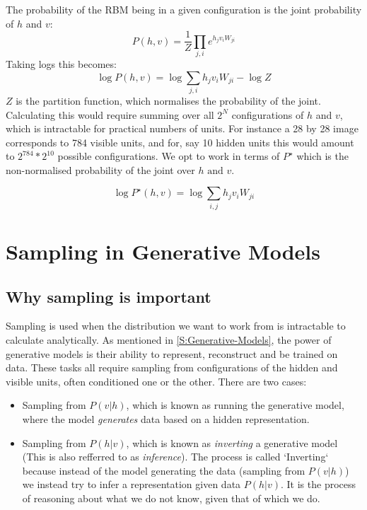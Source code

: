 %
The probability of the RBM being in a given configuration is the joint probability of $h$ and $v$:
$$ P(h,v) = \frac{1}{Z} \prod_{j,i} e^{h_jv_iW_{ji}} $$
Taking logs this becomes:
$$ \log P(h,v) = \log \sum_{j,i} h_jv_i  W_{ji}  - \log Z $$
$ Z $ is the partition function, which normalises the probability of the joint. Calculating this would require summing over all $2^N$ configurations of $h$ and $v$, which is intractable for practical numbers of units. For instance a 28 by 28 image corresponds to 784 visible units, and for, say 10 hidden units this would amount to $ 2^{784} * 2^{10} $ possible configurations. We opt to work in terms of $P^\star$ which is the non-normalised probability of the joint over $h \text{ and } v$.

\begin{equation}\label{eq:LogPJoint}
   \log P^\star(h, v) = \log \sum_{i,j} {h_j v_i W_{ji}}
\end{equation}

\section{Sampling in Generative Models}

\subsection{Why sampling is important}

Sampling is used when the distribution we want to work from is intractable to calculate analytically. As mentioned in \ref{S:Generative-Models}, the power of generative models is their ability to represent, reconstruct and be trained on data. These tasks all require sampling from configurations of the hidden and visible units, often conditioned one or the other. There are two cases:
\begin{itemize}
  \item Sampling from $P(v|h)$, which is known as running the generative model, where the model \emph{generates} data based on a hidden representation.
  \item Sampling from $P(h|v)$, which is known as \emph{inverting} a generative model (This is also refferred to as \emph{inference}). The process is called `Inverting` because instead of the model generating the data (sampling from $P(v|h)$) we instead try to infer a representation given data $P(h|v)$. It is the process of reasoning about what we do not know, given that of which we do.
\end{itemize}


